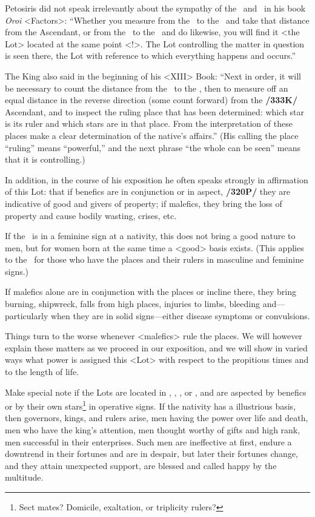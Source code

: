 Petosiris did not speak irrelevantly about the sympathy of the \Sun\, and \Moon\, in his book \textit{Oroi} <Factors>: “Whether you measure from the \Sun\, to the \Moon\, and take that distance from the Ascendant, or from the \Moon\, to the \Sun\, and do likewise, you will find it <the Lot> located at the same point <!>. The Lot controlling the matter in question is seen there, the Lot with reference to which everything happens and occurs.” 

The King also said in the beginning of his <XIII> Book: “Next in order, it will be necessary to count the distance from the \Sun\, to the \Moon, then to measure off an equal distance in the reverse direction (some count forward) from the \textbf{/333K/} Ascendant, and to inspect the ruling place that has been determined: which star is its ruler and which stars are in that place. From the interpretation of these places make a clear determination of the native’s affairs.” (His calling the place “ruling” means “powerful,” and the next phrase “the whole can be seen” means that it is controlling.) 

In addition, in the course of his exposition he often speaks strongly in affirmation of this Lot: that if benefics are in conjunction or in aspect,
\textbf{/320P/} they are indicative of good and givers of property; if malefics, they bring the loss of property and cause bodily wasting, crises, etc.

If the \Moon\, is in a feminine sign at a nativity, this does not bring a good nature to men, but for women born at the same time a <good> basis exists. (This applies to the \Sun\, for those who have the
places and their rulers in masculine and feminine signs.) 

If malefics alone are in conjunction with the  places or incline there, they bring burning, shipwreck, falls from high places, injuries to limbs, bleeding and—particularly when they are in solid signs—either disease symptoms or convulsions. 

Things turn to the worse whenever <malefics> rule the places. We will however explain these matters as we proceed in our exposition, and we will show in varied ways what power is assigned this <Lot> with respect to the propitious times and to the length of life.

Make  special note if the Lots are located in \Cancer, \Leo, \Capricorn, or \Aquarius, and are aspected by benefics or by their own stars\footnote{Sect mates? Domicile, exaltation, or triplicity rulers?} in operative signs. If the nativity has a illustrious basis, then governors,
kings, and rulers arise, men having the power over life and death, men who have the king’s attention, men thought worthy of gifts and high rank, men successful in their enterprises. Such men are ineffective at first, endure a downtrend in their fortunes and are in despair, but later their fortunes change, and they attain unexpected support, are blessed and called happy by the multitude. 

